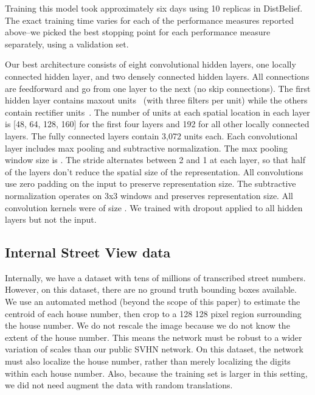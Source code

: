 \documentclass{article} \usepackage{comment}
\begin{document}
Training this model took approximately six days using 10 replicas in DistBelief. The exact training time varies
for each of the performance measures reported above--we picked the best stopping point for each performance measure
separately, using a validation set.

Our best architecture consists of eight convolutional hidden layers, one locally connected hidden layer, and two densely 
connected hidden layers. All connections are feedforward and go from one layer to the next (no skip connections). 
The first hidden layer contains maxout units~\citep{Goodfellow-et-al-ICML2013} (with three filters per unit) while
the others contain rectifier units~\citep{Jarrett-ICCV2009,Glorot+al-AI-2011}.
The number of units at each spatial location in each layer is
[48, 64, 128, 160] for the first four layers and 192 for all other locally connected layers. The fully connected layers
contain 3,072 units each.
Each convolutional layer includes max pooling and subtractive normalization. The max pooling window size is .
The stride alternates between 2 and 1 at each layer, so that half of the layers don't reduce the spatial size of
the representation. All convolutions use zero padding on the input to preserve representation size. The subtractive
normalization operates on 3x3 windows and preserves representation size. All convolution kernels were of size .
We trained with dropout applied to all hidden layers but not the input. 

\subsection{Internal Street View data}
\label{subsec:internal}

Internally, we have a dataset with tens of millions of transcribed street numbers.
However, on this dataset, there are no ground truth bounding boxes available.
We use an automated method (beyond the scope of this paper) to estimate the centroid of
each house number, then crop to a 128  128 pixel region surrounding the house
number. We do not rescale the image because we do not know the extent of the house number.
This means the network must be robust to a wider variation of scales than our public SVHN
network. On this dataset, the network must also localize the house number, rather than
merely localizing the digits within each house number.
Also, because the training
set is larger in this setting, we did not need augment the data with random translations.
\end{document}
